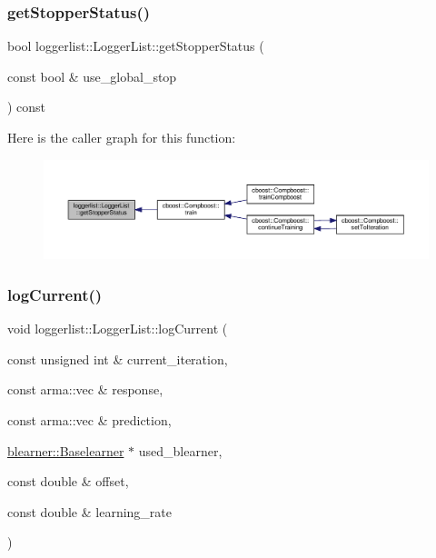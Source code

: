 \mbox{\label{classloggerlist_1_1_logger_list_ad11e128af600ad8e68df3c702ef11792}} 
\subsubsection{\texorpdfstring{get\+Stopper\+Status()}{getStopperStatus()}}
{\footnotesize\ttfamily bool loggerlist\+::\+Logger\+List\+::get\+Stopper\+Status (\begin{DoxyParamCaption}\item[{const bool \&}]{use\+\_\+global\+\_\+stop }\end{DoxyParamCaption}) const}

Here is the caller graph for this function\+:
\nopagebreak
\begin{figure}[H]
\begin{center}
\leavevmode
\includegraphics[width=350pt]{classloggerlist_1_1_logger_list_ad11e128af600ad8e68df3c702ef11792_icgraph}
\end{center}
\end{figure}
\mbox{\label{classloggerlist_1_1_logger_list_a5fc042fd489ebd88c09c469763ee9faa}} 
\subsubsection{\texorpdfstring{log\+Current()}{logCurrent()}}
{\footnotesize\ttfamily void loggerlist\+::\+Logger\+List\+::log\+Current (\begin{DoxyParamCaption}\item[{const unsigned int \&}]{current\+\_\+iteration,  }\item[{const arma\+::vec \&}]{response,  }\item[{const arma\+::vec \&}]{prediction,  }\item[{\hyperlink{classblearner_1_1_baselearner}{blearner\+::\+Baselearner} $\ast$}]{used\+\_\+blearner,  }\item[{const double \&}]{offset,  }\item[{const double \&}]{learning\+\_\+rate }\end{DoxyParamCaption})}

